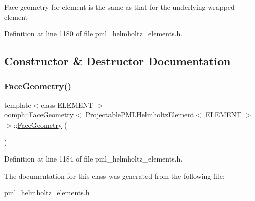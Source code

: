 Face geometry for element is the same as that for the underlying wrapped element 

Definition at line 1180 of file pml\+\_\+helmholtz\+\_\+elements.\+h.



\subsection{Constructor \& Destructor Documentation}
\mbox{\label{classoomph_1_1FaceGeometry_3_01ProjectablePMLHelmholtzElement_3_01ELEMENT_01_4_01_4_ac68bbbfd50ee9671387ce432a63e166e}} 
\subsubsection{\texorpdfstring{Face\+Geometry()}{FaceGeometry()}}
{\footnotesize\ttfamily template$<$class E\+L\+E\+M\+E\+NT $>$ \\
\hyperlink{classoomph_1_1FaceGeometry}{oomph\+::\+Face\+Geometry}$<$ \hyperlink{classoomph_1_1ProjectablePMLHelmholtzElement}{Projectable\+P\+M\+L\+Helmholtz\+Element}$<$ E\+L\+E\+M\+E\+NT $>$ $>$\+::\hyperlink{classoomph_1_1FaceGeometry}{Face\+Geometry} (\begin{DoxyParamCaption}{ }\end{DoxyParamCaption})\hspace{0.3cm}{\ttfamily [inline]}}



Definition at line 1184 of file pml\+\_\+helmholtz\+\_\+elements.\+h.



The documentation for this class was generated from the following file\+:\begin{DoxyCompactItemize}
\item 
\hyperlink{pml__helmholtz__elements_8h}{pml\+\_\+helmholtz\+\_\+elements.\+h}\end{DoxyCompactItemize}
